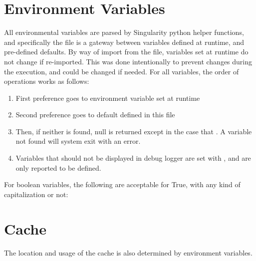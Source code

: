 \documentclass[letterpaper,10pt,english]{sphinxmanual}
\begin{document}
\section{Environment Variables}
\label{\detokenize{build_environment:environment-variables}}
All environmental variables are parsed by Singularity python helper
functions, and specifically the file  is a gateway
between variables defined at runtime, and pre-defined defaults. By way
of import from the file, variables set at runtime do not change if
re-imported. This was done intentionally to prevent changes during the
execution, and could be changed if needed. For all variables, the
order of operations works as follows:
\begin{enumerate}
\item {} 
First preference goes to environment variable set at runtime

\item {} 
Second preference goes to default defined in this file

\item {} 
Then, if neither is found, null is returned except in the case that .
A  variable not found will system exit with an error.

\item {} 
Variables that should not be displayed in debug logger are set with ,
and are only reported to be defined.

\end{enumerate}

For boolean variables, the following are acceptable for True, with any
kind of capitalization or not:

%
\begin{sphinxVerbatim}[commandchars=\\\{\}]
   
\end{sphinxVerbatim}


\section{Cache}
\label{\detokenize{build_environment:cache}}
The location and usage of the cache is also determined by environment
variables.
\end{document}
